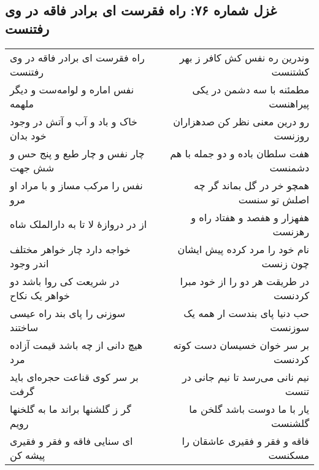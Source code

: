 \begin{center}
\section*{غزل شماره ۷۶: راه فقرست ای برادر فاقه در وی رفتنست}
\label{sec:076}
\begin{longtable}{l p{0.5cm} r}
راه فقرست ای برادر فاقه در وی رفتنست
&&
وندرین ره نفس کش کافر ز بهر کشتنست
\\
نفس اماره و لوامه‌ست و دیگر ملهمه
&&
مطمئنه با سه دشمن در یکی پیراهنست
\\
خاک و باد و آب و آتش در وجود خود بدان
&&
رو درین معنی نظر کن صدهزاران روزنست
\\
چار نفس و چار طبع و پنج حس و شش جهت
&&
هفت سلطان باده و دو جمله با هم دشمنست
\\
نفس را مرکب مساز و با مراد او مرو
&&
همچو خر در گل بماند گر چه اصلش تو سنست
\\
از در دروازهٔ لا تا به دارالملک شاه
&&
هفهزار و هفصد و هفتاد راه و رهزنست
\\
خواجه دارد چار خواهر مختلف اندر وجود
&&
نام خود را مرد کرده پیش ایشان چون زنست
\\
در شریعت کی روا باشد دو خواهر یک نکاح
&&
در طریقت هر دو را از خود مبرا کردنست
\\
سوزنی را پای بند راه عیسی ساختند
&&
حب دنیا پای بندست ار همه یک سوزنست
\\
هیچ دانی از چه باشد قیمت آزاده مرد
&&
بر سر خوان خسیسان دست کوته کردنست
\\
بر سر کوی قناعت حجره‌ای باید گرفت
&&
نیم نانی می‌رسد تا نیم جانی در تنست
\\
گر ز گلشنها براند ما به گلخنها رویم
&&
یار با ما دوست باشد گلخن ما گلشنست
\\
ای سنایی فاقه و فقر و فقیری پیشه کن
&&
فاقه و فقر و فقیری عاشقان را مسکنست
\\
\end{longtable}
\end{center}

